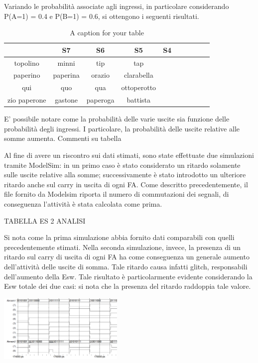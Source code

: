 Variando le probabilità associate agli ingressi, in particolare considerando P(A=1) = 0.4 e P(B=1) = 0.6, si ottengono i seguenti risultati.

\begin{table}
\begin{center}
\begin{tabular}{|c|c|c|c|c|c|c|c|c|c|}
\hline
 & S7 & S6 & S5 & S4 \\
\hline
topolino & minni & tip & tap \\
\hline
\hline
paperino & paperina & orazio & clarabella \\
\hline
qui & quo & qua & ottoperotto \\
zio paperone & gastone & paperoga & battista \\ 
\hline 
\end{tabular}
\end{center}
\caption{A caption for your table}
\label{A-lable-for-your-table}
\end{table}

E' possibile notare come la probabilità delle varie uscite sia funzione delle probabilità degli ingressi.
I particolare, la probabilità delle uscite relative alle somme aumenta. Commenti su tabella

Al fine di avere un riscontro sui dati stimati, sono state effettuate due simulazioni tramite ModelSim: in un primo caso è stato considerato un ritardo solamente sulle uscite relative alla somme; successivamente è stato introdotto un ulteriore ritardo anche sul carry in uscita di ogni FA.
Come descritto precedentemente, il file fornito da Modelsim riporta il numero di commutazioni dei segnali, di conseguenza l'attività è stata calcolata come prima.

TABELLA ES 2 ANALISI

Si nota come la prima simulazione abbia fornito dati comparabili con quelli precedentemente stimati. Nella seconda simulazione, invece, la presenza di un ritardo sul carry di uscita di ogni FA ha come conseguenza un generale aumento dell'attività delle uscite di somma. Tale ritardo causa infatti glitch, responsabili dell'aumento della Esw.
Tale risultato è particolarmente evidente considerando la Esw totale dei due casi: si nota che la presenza del ritardo raddoppia tale valore.

\includegraphics[width=6cm]{./img/Lab_1/Es_2/Glitch.png} 



